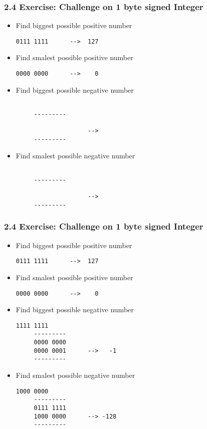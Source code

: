 \begin{frame}[fragile]
  \frametitle{2.4 Exercise: Challenge on 1 byte signed Integer}
    \begin{itemize}
        \item Find biggest possible positive number
  \begin{lstlisting}[basicstyle=\tiny]
     0111 1111		-->  127
  \end{lstlisting}
        \item Find smalest possible positive number
  \begin{lstlisting}[basicstyle=\tiny]
     0000 0000		-->    0
  \end{lstlisting}
        \item Find biggest possible negative number
  \begin{lstlisting}[basicstyle=\tiny]
     
     ---------	
     
              		--> 
     ---------	
  \end{lstlisting}
        \item Find smalest possible negative number
  \begin{lstlisting}[basicstyle=\tiny]
     
     ---------
    
              		--> 
     ---------
  \end{lstlisting}
    \end{itemize}
\end{frame}


\begin{frame}[fragile]
  \frametitle{2.4 Exercise: Challenge on 1 byte signed Integer}
    \begin{itemize}
        \item Find biggest possible positive number
  \begin{lstlisting}[basicstyle=\tiny]
     0111 1111		-->  127
  \end{lstlisting}
        \item Find smalest possible positive number
  \begin{lstlisting}[basicstyle=\tiny]
     0000 0000		-->    0
  \end{lstlisting}
        \item Find biggest possible negative number
  \begin{lstlisting}[basicstyle=\tiny]
     1111 1111	
     ---------	
     0000 0000	
     0000 0001		-->   -1
     ---------	
  \end{lstlisting}
        \item Find smalest possible negative number
  \begin{lstlisting}[basicstyle=\tiny]
     1000 0000
     ---------
     0111 1111
     1000 0000		--> -128
     ---------
  \end{lstlisting}
    \end{itemize}
\end{frame}


